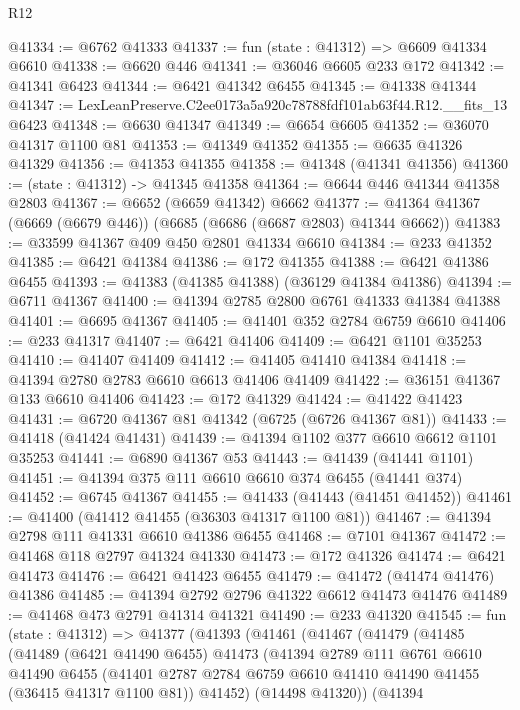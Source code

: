 \begin{lexlean}{R12}
\begin{coremodule}
@41334 := @6762 @41333
@41337 := fun (state : @41312) => @6609 @41334 @6610
@41338 := @6620 @446
@41341 := @36046 @6605 @233 @172
@41342 := @41341 @6423
@41344 := @6421 @41342 @6455
@41345 := @41338 @41344
@41347 := LexLeanPreserve.C2ee0173a5a920c78788fdf101ab63f44.R12.__fits_13 @6423
@41348 := @6630 @41347
@41349 := @6654 @6605
@41352 := @36070 @41317 @1100 @81
@41353 := @41349 @41352
@41355 := @6635 @41326 @41329
@41356 := @41353 @41355
@41358 := @41348 (@41341 @41356)
@41360 := (state : @41312) -> @41345 @41358
@41364 := @6644 @446 @41344 @41358 @2803
@41367 := @6652 (@6659 @41342) @6662
@41377 := @41364 @41367 (@6669 (@6679 @446)) (@6685 (@6686 (@6687 @2803) @41344 @6662))
@41383 := @33599 @41367 @409 @450 @2801 @41334 @6610
@41384 := @233 @41352
@41385 := @6421 @41384
@41386 := @172 @41355
@41388 := @6421 @41386 @6455
@41393 := @41383 (@41385 @41388) (@36129 @41384 @41386)
@41394 := @6711 @41367
@41400 := @41394 @2785 @2800 @6761 @41333 @41384 @41388
@41401 := @6695 @41367
@41405 := @41401 @352 @2784 @6759 @6610
@41406 := @233 @41317
@41407 := @6421 @41406
@41409 := @6421 @1101 @35253
@41410 := @41407 @41409
@41412 := @41405 @41410 @41384
@41418 := @41394 @2780 @2783 @6610 @6613 @41406 @41409
@41422 := @36151 @41367 @133 @6610 @41406
@41423 := @172 @41329
@41424 := @41422 @41423
@41431 := @6720 @41367 @81 @41342 (@6725 (@6726 @41367 @81))
@41433 := @41418 (@41424 @41431)
@41439 := @41394 @1102 @377 @6610 @6612 @1101 @35253
@41441 := @6890 @41367 @53
@41443 := @41439 (@41441 @1101)
@41451 := @41394 @375 @111 @6610 @6610 @374 @6455 (@41441 @374)
@41452 := @6745 @41367
@41455 := @41433 (@41443 (@41451 @41452))
@41461 := @41400 (@41412 @41455 (@36303 @41317 @1100 @81))
@41467 := @41394 @2798 @111 @41331 @6610 @41386 @6455
@41468 := @7101 @41367
@41472 := @41468 @118 @2797 @41324 @41330
@41473 := @172 @41326
@41474 := @6421 @41473
@41476 := @6421 @41423 @6455
@41479 := @41472 (@41474 @41476) @41386
@41485 := @41394 @2792 @2796 @41322 @6612 @41473 @41476
@41489 := @41468 @473 @2791 @41314 @41321
@41490 := @233 @41320
@41545 := fun (state : @41312) =>
  @41377
    (@41393
      (@41461
        (@41467
          (@41479
            (@41485
              (@41489
                (@6421 @41490 @6455)
                @41473
                (@41394
                  @2789
                  @111
                  @6761
                  @6610
                  @41490
                  @6455
                  (@41401 @2787 @2784 @6759 @6610 @41410 @41490 @41455 (@36415 @41317 @1100 @81))
                  @41452)
                (@14498 @41320))
              (@41394

\end{coremodule}
\end{lexlean}
